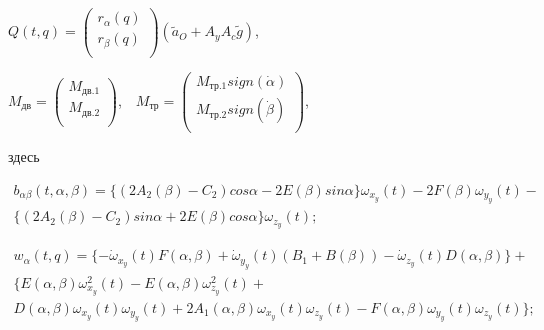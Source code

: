 \(
Q(t,q)=
\left( 
\begin{matrix}
r_{\alpha} (q) \\
r_{\beta} (q) \\
\end{matrix}
\right)
(\tilde{a}_O + A_y A_c \tilde{g})
\),

\( M_{\textit{дв}}= \left( \begin{matrix}
M_{\textit{дв.1}}\\
M_{\textit{дв.2}}\\
\end{matrix}
\right) \),\ \ \( M_{\textit{тр}}= \left( \begin{matrix}
M_{\textit{тр.1}}sign \left( \dot \alpha \right) \\
M_{\textit{тр.2}}sign \left( \dot \beta \right) \\
\end{matrix}
\right) \), 

здесь 

\begin{equation}
\label{eq:p3:48+1}
\begin{multlined}
b_{ \alpha \beta } \left( t, \alpha, \beta \right) = \lbrace \left( 2A_{2} \left( \beta \right) -C_{2} \right) cos \alpha -2E \left( \beta \right) sin \alpha \rbrace \omega _{x_{y}} \left( t \right) -2F \left( \beta \right) \omega _{y_{y}} \left( t \right) - \\ 
\lbrace \left( 2A_{2} \left( \beta \right) -C_{2} \right) sin \alpha +2E \left( \beta \right) cos \alpha \rbrace \omega _{z_{y}} \left( t \right) ;
\end{multlined}
\end{equation}

\begin{equation}
\label{eq:p3:48+2}
\begin{multlined}
w_{ \alpha } ( t,q ) = 
\lbrace - \dot \omega _{x_{y}} ( t ) F ( \alpha, \beta ) + 
\dot \omega _{y_{y}} ( t ) ( B_{1}+B ( \beta ) ) - 
\dot \omega _{z_{y}} ( t ) D ( \alpha, \beta ) \rbrace +\\
\lbrace E ( \alpha, \beta ) \omega _{x_{y}}^{2} ( t ) -E ( \alpha, \beta ) \omega _{z_{y}}^{2} ( t ) +\\
D ( \alpha, \beta ) \omega _{x_{y}} ( t ) \omega _{y_{y}} ( t ) +2A_{1} ( \alpha, \beta ) \omega _{x_{y}} ( t ) \omega _{z_{y}} ( t ) -F ( \alpha, \beta ) \omega _{y_{y}} ( t ) \omega _{z_{y}} ( t ) \rbrace ;
\end{multlined}
\end{equation}

